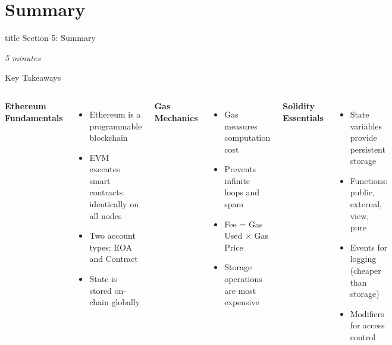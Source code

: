 \documentclass[8pt,aspectratio=169]{beamer}
\begin{document}
\section{Summary}

\begin{frame}[t]
\vfill
\centering
\begin{beamercolorbox}[sep=8pt,center]{title}
\Large Section 5: Summary\par
\end{beamercolorbox}
\vfill
\small \textit{5 minutes}
\end{frame}

\begin{frame}[t]{Key Takeaways}
\begin{columns}[T]
\textbf{Ethereum Fundamentals}
\begin{itemize}
\item \checkmark Ethereum is a programmable blockchain
\item \checkmark EVM executes smart contracts identically on all nodes
\item \checkmark Two account types: EOA and Contract
\item \checkmark State is stored on-chain globally
\end{itemize}

\vspace{0.5em}
\textbf{Gas Mechanics}
\begin{itemize}
\item \checkmark Gas measures computation cost
\item \checkmark Prevents infinite loops and spam
\item \checkmark Fee = Gas Used $\times$ Gas Price
\item \checkmark Storage operations are most expensive
\end{itemize}

\textbf{Solidity Essentials}
\begin{itemize}
\item \checkmark State variables provide persistent storage
\item \checkmark Functions: public, external, view, pure
\item \checkmark Events for logging (cheaper than storage)
\item \checkmark Modifiers for access control
\end{itemize}


\end{columns}
\end{frame}
\end{document}
